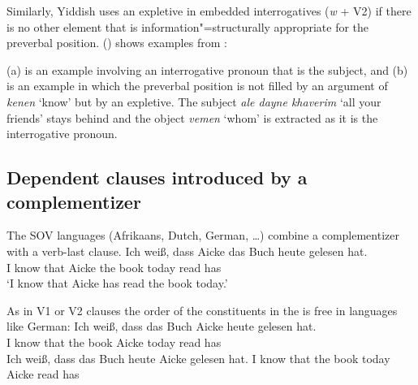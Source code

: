 Similarly, Yiddish uses an expletive in embedded interrogatives (\emph{w} + V2) if 
there is no other element that is information"=structurally appropriate for the preverbal position.
() shows examples from \citet[--404]{Prince89a}:

\eal
\label{ex-Yiddish-interrogatives-expletive}
\zl
(a) is an example involving an interrogative pronoun that is the subject, and (b) is an
example in which the preverbal position is not filled by an argument of \emph{kenen} `know' but by
an expletive. The subject \emph{ale dayne khaverim} `all your friends' stays behind and the object
\emph{vemen} `whom' is extracted as it is the interrogative pronoun.


\subsection{Dependent clauses introduced by a complementizer}


The SOV languages (Afrikaans, Dutch, German, \ldots) combine a complementizer with a verb-last clause.
\ea
\gll Ich weiß, dass Aicke das Buch heute gelesen hat.\\
     I   know  that Aicke the book today read    has\\
\glt `I know that Aicke has read the book today.'
\z

As in V1 or V2 clauses the order of the constituents in the \mf is free in languages like German:
\eal
\ex 
\gll Ich weiß, dass das Buch Aicke heute gelesen hat.\\
     I   know  that the book Aicke today read has\\
\ex 
\gll Ich weiß, dass das Buch heute Aicke gelesen hat.
     I   know  that the book today Aicke read has\\
\zl

